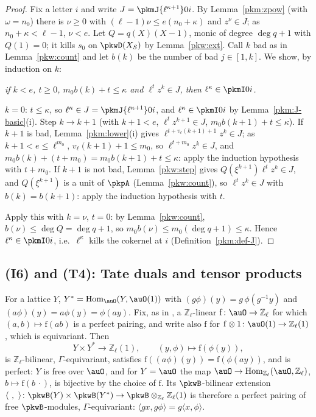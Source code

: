 \documentclass[10pt]{amsart}
\theoremstyle{definition}
\theoremstyle{remark}
\newcommand{\Z}{\mathbb Z}
\begin{document}
\begin{proof}
Fix a letter $i$ and write $J=\pkmJ{\ell^{\kappa+1}}0i$. By Lemma~\ref{pkm:zpow} (with $\omega=n_0$) there is
$\nu\ge0$ with $(\ell-1)\nu\le e(n_0+\kappa)$ and $z^\nu\in J$; as $n_0+\kappa<\ell-1$, $\nu<e$. Let
$Q=q(X)(X-1)$, monic of degree $\deg q+1$ with $Q(1)=0$; it kills $s_0$ on $\pkwD(X_S)$ by
Lemma~\ref{pkw:ext}. Call $k$ bad as in Lemma~\ref{pkw:count} and let $b(k)$ be the number of bad
$j\in[1,k]$. We show, by induction on $k$:

\emph{if $k<e$, $t\ge0$, $m_0b(k)+t\le\kappa$ and $\ell^tz^k\in J$, then $\ell^\kappa\in\pkmI0i$.}

$k=0$: $t\le\kappa$, so $\ell^\kappa\in J=\pkmJ{\ell^{\kappa+1}}0i$, and $\ell^\kappa\in\pkmI0i$ by
Lemma~\ref{pkm:J-basic}(i). Step $k\to k+1$ (with $k+1<e$, $\ell^tz^{k+1}\in J$, $m_0b(k+1)+t\le\kappa$). If $k+1$
is bad, Lemma~\ref{pkm:lower}(i) gives $\ell^{t+v_\ell(k+1)+1}z^k\in J$; as $k+1<e\le\ell^{m_0}$,
$v_\ell(k+1)+1\le m_0$, so $\ell^{t+m_0}z^k\in J$, and $m_0b(k)+(t+m_0)=m_0b(k+1)+t\le\kappa$: apply the induction
hypothesis with $t+m_0$. If $k+1$ is not bad, Lemma~\ref{pkw:step} gives $Q(\xi^{k+1})\ell^tz^k\in J$, and
$Q(\xi^{k+1})$ is a unit of $\pkpA$ (Lemma~\ref{pkw:count}), so $\ell^tz^k\in J$ with $b(k)=b(k+1)$: apply the
induction hypothesis with $t$.

Apply this with $k=\nu$, $t=0$: by Lemma~\ref{pkw:count}, $b(\nu)\le\deg Q=\deg q+1$, so
$m_0b(\nu)\le m_0(\deg q+1)\le\kappa$. Hence $\ell^\kappa\in\pkmI0i$, i.e.\ $\ell^\kappa$ kills the cokernel at $i$
(Definition~\ref{pkm:def-J}).
\end{proof}



\subsection{(I6) and (T4): Tate duals and tensor products}\label{pkw:ss-T4}

For a lattice $Y$, $Y^*=\operatorname{Hom}_\auO(Y,\auO(1))$ with $(g\phi)(y)=g\,\phi(g^{-1}y)$ and
$(a\phi)(y)=a\phi(y)=\phi(ay)$. Fix, as in {\cite[Definition~5.1(4)]{P55}}, a $\Z_\ell$-linear $\mathrm f\colon
\auO\to\Z_\ell$ for which $(a,b)\mapsto\mathrm f(ab)$ is a perfect pairing, and write also $\mathrm f$ for
$\mathrm f\otimes1\colon\auO(1)\to\Z_\ell(1)$, which is equivariant. Then
\[
Y\times Y^*\to\Z_\ell(1),\qquad (y,\phi)\mapsto\mathrm f(\phi(y)),
\]
is $\Z_\ell$-bilinear, $\Gamma$-equivariant, satisfies $\mathrm f((a\phi)(y))=\mathrm f(\phi(ay))$, and is perfect:
$Y$ is free over $\auO$, and for $Y=\auO$ the map $\auO\to\operatorname{Hom}_{\Z_\ell}(\auO,\Z_\ell)$, $b\mapsto
\mathrm f(b\,\cdot)$, is bijective by the choice of $\mathrm f$. Its $\pkwB$-bilinear extension
$\langle\ ,\ \rangle\colon\pkwB(Y)\times\pkwB(Y^*)\to\pkwB\otimes_{\Z_\ell}\Z_\ell(1)$ is therefore a perfect
pairing of free $\pkwB$-modules, $\Gamma$-equivariant: $\langle gx,g\phi\rangle=g\langle x,\phi\rangle$.
\end{document}
